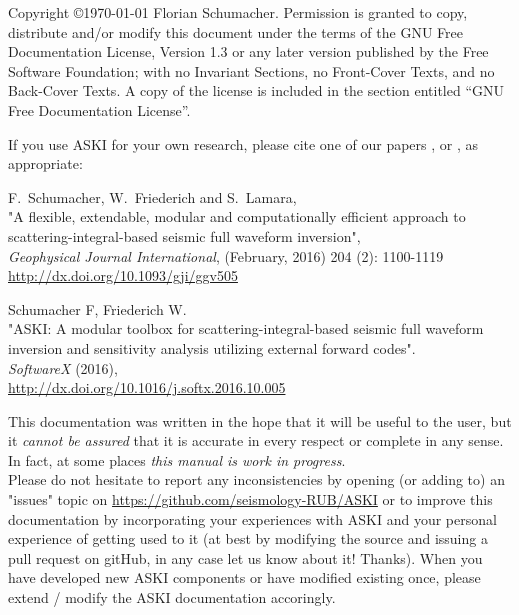 \documentclass[12pt,a4paper]{book}
\newcommand{\ASKI}{{\ttfamily ASKI}}
\begin{document}
\sloppy
%
\setlength{\parindent}{0em}
\setlength{\parskip}{0.5em}
%
%

%
Copyright \copyright {\myyear \today} Florian Schumacher.
Permission is granted to copy, distribute and/or modify this document
under the terms of the GNU Free Documentation License, Version 1.3
or any later version published by the Free Software Foundation;
with no Invariant Sections, no Front-Cover Texts, and no Back-Cover Texts.
A copy of the license is included in the section entitled ``GNU
Free Documentation License''.

\vspace{1cm}

If you use \ASKI{} for your own research, please cite one of our papers \cite{Schumacher16}, 
or \cite{Schumacher16b}, as appropriate:

F.\ Schumacher, W.\ Friederich and S.\ Lamara, \\
"A flexible, extendable, modular and 
computationally efficient approach to scattering-integral-based seismic full waveform 
inversion", \\
\emph{Geophysical Journal International}, (February, 2016) 204 (2): 1100-1119\\
\url{http://dx.doi.org/10.1093/gji/ggv505}

Schumacher F, Friederich W.\\
"ASKI: A modular toolbox for scattering-integral-based seismic full waveform 
inversion and sensitivity analysis utilizing external forward codes".\\
\emph{SoftwareX} (2016),\\
\url{http://dx.doi.org/10.1016/j.softx.2016.10.005}

\vspace{1em}

This documentation was written in the hope that it will be useful to the user,
but it \emph{cannot be assured} that it is accurate in every respect or complete in any sense.
In fact, at some places \emph{this manual is work in progress}.\\
Please do not hesitate to report any inconsistencies by
opening (or adding to) an "issues" topic on \url{https://github.com/seismology-RUB/ASKI}
or to improve this documentation by incorporating your experiences with \ASKI{} 
and your personal experience of getting used to it (at best by modifying the source and issuing a pull request
on gitHub, in any case let us know about it! Thanks). 
When you have developed new \ASKI{} components or 
have modified existing once, please extend / modify the \ASKI{} documentation accoringly.
\end{document}
